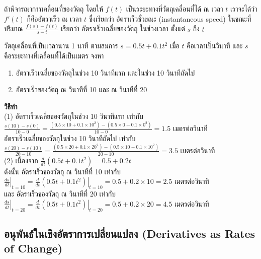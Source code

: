 \documentclass[
]{book}
\begin{document}
ถ้าพิจารณาการเคลื่อนที่ของวัตถุ โดยให้ \(f(t)\) เป็นระยะทางที่วัตถุเคลื่อนที่ได้ ณ เวลา
\(t\) เราจะได้ว่า \(f'(t)\) ก็คืออัตราเร็ว ณ เวลา \(t\) ซึ่งเรียกว่า อัตราเร็วชั่วขณะ
(instantaneous speed) ในขณะที่ปริมาณ
\(\displaystyle \frac{f(s)-f(t)}{s-t}\) เรียกว่า อัตราเร็วเฉลี่ยของวัตถุ
ในช่วงเวลา ตั้งแต่ \(s\) ถึง \(t\)

วัตถุเคลื่อนที่เป็นเวลานาน 1 นาที ตามสมการ \(s=0.5t+0.1t^2\) เมื่อ \(t\)
คือเวลาเป็นวินาที และ \(s\) คือระยะทางที่เคลื่อนที่ได้เป็นเมตร จงหา

\begin{enumerate}
\def\labelenumi{(\arabic{enumi})}
\item
  อัตราเร็วเฉลี่ยของวัตถุในช่วง 10 วินาทีแรก และในช่วง 10 วินาทีถัดไป
\item
  อัตราเร็วของวัตถุ ณ วินาทีที่ 10 และ ณ วินาทีที่ 20
\end{enumerate}

\textbf{วิธีทำ}\\
(1) อัตราเร็วเฉลี่ยของวัตถุในช่วง 10 วินาทีแรก เท่ากับ\\
\(\displaystyle\frac{s(10)-s(0)}{10-0}
       =\frac{(0.5\times10+0.1\times10^2)-(0.5\times0+0.1\times0^2)}{10-0}=1.5\)
เมตรต่อวินาที\\
อัตราเร็วเฉลี่ยของวัตถุในช่วง 10 วินาทีถัดไป เท่ากับ\\
\(\displaystyle\frac{s(20)-s(10)}{20-10}
       =\frac{(0.5\times20+0.1\times20^2)-(0.5\times10+0.1\times10^2)}{20-10}=3.5\)
เมตรต่อวินาที\\
(2) เนื่องจาก
\(\displaystyle\frac{d}{dt}\left(0.5t+0.1t^2\right)=0.5+0.2t\)\\
ดังนั้น อัตราเร็วของวัตถุ ณ วินาทีที่ 10 เท่ากับ\\
\(\displaystyle\left.\frac{ds}{dt}\right|_{t=10}
       =\left.\frac{d}{dt}\left(0.5t+0.1t^2\right)\right|_{t=10}=0.5+0.2\times10=2.5\)
เมตรต่อวินาที\\
และ อัตราเร็วของวัตถุ ณ วินาทีที่ 20 เท่ากับ\\
\(\displaystyle\left.\frac{ds}{dt}\right|_{t=20}
       =\left.\frac{d}{dt}\left(0.5t+0.1t^2\right)\right|_{t=20}=0.5+0.2\times20=4.5\)
เมตรต่อวินาที

\subsection{อนุพันธ์ในเชิงอัตราการเปลี่ยนแปลง (Derivatives as Rates of
Change)}\label{uxe2duxe19uxe1euxe19uxe18uxe43uxe19uxe40uxe0auxe07uxe2duxe15uxe23uxe32uxe01uxe32uxe23uxe40uxe1buxe25uxe22uxe19uxe41uxe1buxe25uxe07-derivatives-as-rates-of-change}
\end{document}
